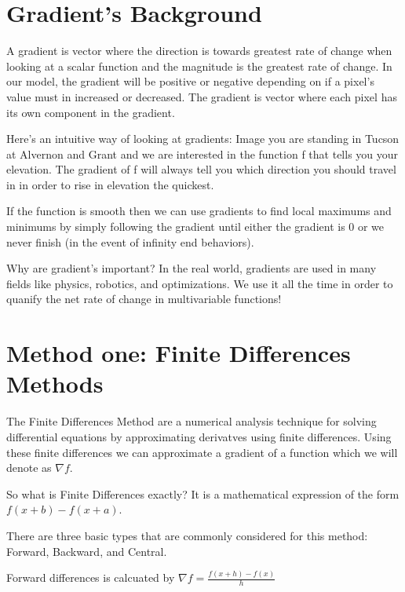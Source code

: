 \documentclass[letterpaper,10pt,english]{jupyterBook}
\begin{document}
\section{Gradient’s Background}
\label{\detokenize{finite_gradient:gradient-s-background}}
\sphinxAtStartPar
A gradient is vector where the direction is towards greatest rate of change when looking at a scalar function and the magnitude is the greatest rate of change. In our model, the gradient will be positive or negative depending on if a pixel’s value must in increased or decreased. The gradient is vector where each pixel has its own component in the gradient.

\sphinxAtStartPar
Here’s an intuitive way of looking at gradients: Image you are standing in Tucson at Alvernon and Grant and we are interested in the function f that tells you your elevation. The gradient of f will always tell you which direction you should travel in in order to rise in elevation the quickest.

\sphinxAtStartPar
If the function is smooth then we can use gradients to find local maximums and minimums by simply following the gradient until either the gradient is 0 or we never finish (in the event of infinity end behaviors).

\sphinxAtStartPar
Why are gradient’s important? In the real world, gradients are used in many fields like physics, robotics, and optimizations. We use it all the time in order to quanify the net rate of change in multi\sphinxhyphen{}variable functions!


\section{Method one: Finite Differences Methods}
\label{\detokenize{finite_gradient:method-one-finite-differences-methods}}
\sphinxAtStartPar
The Finite Differences Method are a numerical analysis technique for solving differential equations by approximating derivatves using finite differences. Using these finite differences we can approximate a gradient of a function which we will denote as \(\nabla f\).

\sphinxAtStartPar
So what is Finite Differences exactly? It is a mathematical expression of the form \(f(x+b)-f(x+a)\).

\sphinxAtStartPar
There are three basic types that are commonly considered for this method: Forward, Backward, and Central.

\sphinxAtStartPar
Forward differences is calcuated by \(\nabla f = \frac{f(x+h)-f(x)}{h}\)
\end{document}
